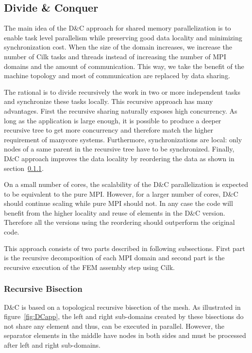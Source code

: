 \documentclass{IOS-Book-Article}
\begin{document}
\subsection{Divide \& Conquer}

The main idea of the D\&C approach for shared memory parallelization is to enable task level parallelism while preserving good data locality and minimizing synchronization cost.
When the size of the domain increases, we increase the number of Cilk tasks and threads instead of increasing the number of MPI domains and the amount of communication.
This way, we take the benefit of the machine topology and most of communication are replaced by data sharing.

The rational is to divide recursively the work in two or more independent tasks and synchronize these tasks locally. This recursive approach has many advantages.
First the recursive sharing naturally exposes high concurrency. As long as the application is large enough, it is possible to produce a deeper recursive tree to get more concurrency and 
therefore match the higher requirement of manycore systems. Furthermore, synchronizations are local: only nodes of a same parent in the recursive tree have to be synchronized.
Finally, D\&C approach improves the data locality by reordering the data as shown in section~\ref{sec:DCrec}.

On a small number of cores, the scalability of the D\&C parallelization is expected to be equivalent to the pure MPI.
However, for a larger number of cores, D\&C should continue scaling while pure MPI should not.
In any case the code will benefit from the higher locality and reuse of elements in the D\&C version. Therefore all the versions using the reordering should outperform the original code.

This approach consists of two parts described in following subsections.
First part is the recursive decomposition of each MPI domain and second part is the recursive execution of the FEM assembly step using Cilk.

\subsubsection{Recursive Bisection}
\label{sec:DCrec}
D\&C is based on a topological recursive bisection of the mesh.
As illustrated in figure~\ref{fig:DCapp}, the left and right sub-domains created by these bisections do not share any element and thus, can be executed in parallel.
However, the separator elements in the middle have nodes in both sides and must be processed after left and right sub-domains.
\end{document}
